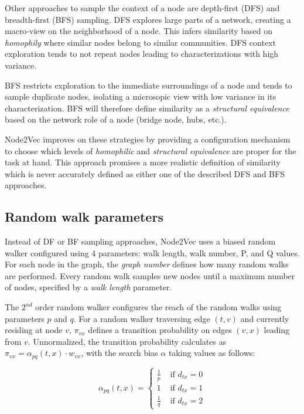 \documentclass[a4paper,10pt]{article}
\begin{document}
Other approaches to sample the context of a node are depth-first (DFS) and breadth-first (BFS) sampling. DFS explores large parts of a network, creating a macro-view on the neighborhood of a node. This infers similarity based on \textit{homophily} where similar nodes belong to similar communities. DFS context exploration tends to not repeat nodes leading to characterizations with high variance.

BFS restricts exploration to the immediate surroundings of a node and tends to sample duplicate nodes, isolating a microsopic view with low variance in its characterization. BFS will therefore define similarity as a \textit{structural equivalence} based on the network role of a node (bridge node, hubs, etc.).

Node2Vec improves on these strategies by providing a configuration mechanism to choose which levels of \textit{homophilic} and \textit{structural equivalence} are proper for the task at hand. This approach promises a more realistic definition of similarity which is never accurately defined as either one of the described DFS and BFS approaches.

\subsection{Random walk parameters}

Instead of DF or BF sampling approaches, Node2Vec uses a biased random walker configured using 4 parameters: walk length, walk number, P, and Q values. For each  node in the graph, the \textit{graph number} defines how many random walks are performed. Every random walk samples new nodes until a maximum number of nodes, specified by a \textit{walk length} parameter.

The $2^{nd}$ order random walker configures the reach of the random walks using parameters $p$ and $q$. For a random walker traversing edge $(t, v)$ and currently residing at node $v$, $\pi_{vx}$ defines a transition probability on edges $(v, x)$ leading from $v$. Unnormalized, the transition probability calculates as $\pi_{v x}=\alpha_{p q}(t, x) \cdot w_{v x}$, with the search bias $\alpha$ taking values as follows:

$$
\alpha_{p q}(t, x)=\left\{\begin{array}{ll}
\frac{1}{p} & \text { if } d_{t x}=0 \\
1 & \text { if } d_{t x}=1 \\
\frac{1}{q} & \text { if } d_{t x}=2
\end{array}\right.
$$
\end{document}
